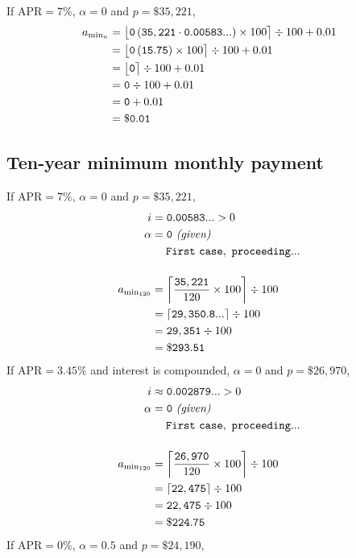 \documentclass[12pt,letterpaper,oneside]{article}
\theoremstyle{remark} %
\begin{document}
	If $\mbox{APR}=7\%$, $\alpha=0$ and $p=\$35,221$,
	\begin{align*}
	a_{\rm{min_{\mathnormal{n}}}}&=\big\lfloor{\mathtt{0}\left(\mathtt{35,221}\cdot\mathtt{0.00583...}\right)\times 100}\big\rceil\div 100+0.01\\
	&=\big\lfloor{\mathtt{0}\left(\mathtt{15.75}\right)\times 100}\big\rceil\div 100+0.01\\
	&=\big\lfloor{\mathtt{0}}\big\rceil\div 100+0.01\\
	&=\mathtt{0}\div 100+0.01\\
	&=\mathtt{0}+0.01\\
	&=\mathtt{\$0.01}\\
	\end{align*}	

	\newpage

	\subsection{Ten-year minimum monthly payment}\label{errorcheck}
	If $\mbox{APR}=7\%$, $\alpha=0$ and $p=\$35,221$,
	\begin{align*}
	i&=\mathtt{0.00583...}>0\\
	\alpha&=\mathtt{0}\ \textit{(given)}\\
	&\quad\;\mathtt{First\ case,\ proceeding...}\\[12pt]
	a_{\rm{min_{120}}}&=\left\lceil{\frac{\mathtt{35,221}}{120}\times 100}\right\rceil\div 100\\
	&=\left\lceil{\mathtt{29,350.8...}}\right\rceil\div 100\\
	&=\mathtt{29,351}\div 100\\
	&=\mathtt{\$293.51}
	\end{align*}
	If $\mbox{APR}=3.45\%$ and interest is compounded, $\alpha=0$ and $p=\$26,970$,
	\begin{align*}
	i&\approx\mathtt{0.002879...}>0\\
	\alpha&=\mathtt{0}\ \textit{(given)}\\
	&\quad\;\mathtt{First\ case,\ proceeding...}\\[12pt]
	a_{\rm{min_{120}}}&=\left\lceil{\frac{\mathtt{26,970}}{120}\times 100}\right\rceil\div 100\\
	&=\left\lceil{\mathtt{22,475}}\right\rceil\div 100\\
	&=\mathtt{22,475}\div 100\\
	&=\mathtt{\$224.75}
	\end{align*}
	If $\mbox{APR}=0\%$, $\alpha=0.5$ and $p=\$24,190$,
\end{document}
